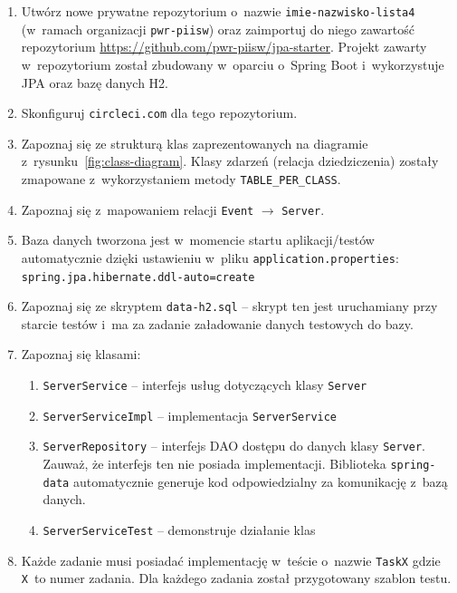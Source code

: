 \documentclass[12pt]{article}
\begin{document}
        \begin{enumerate}
            \item Utwórz nowe prywatne repozytorium o~nazwie \texttt{imie-nazwisko-lista4} (w~ramach organizacji \texttt{pwr-\allowbreak piisw}) oraz zaimportuj do niego zawartość repozytorium \url{https://github.com/pwr-piisw/jpa-starter}. Projekt zawarty w~repozytorium został zbudowany w~oparciu o~Spring Boot i~wykorzystuje JPA oraz bazę danych H2.
            \item Skonfiguruj \texttt{circleci.com} dla tego repozytorium.
            \item Zapoznaj się ze strukturą klas zaprezentowanych na diagramie z~rysunku~\ref{fig:class-diagram}. Klasy zdarzeń (relacja dziedziczenia) zostały zmapowane z~wykorzystaniem metody \texttt{TABLE\_PER\_CLASS}.
            \item Zapoznaj się z~mapowaniem relacji \texttt{Event} $\rightarrow$ \texttt{Server}.
            \item Baza danych tworzona jest w~momencie startu aplikacji/testów automatycznie dzięki ustawieniu w~pliku \texttt{application.properties}: \texttt{spring\-.jpa\-.hibernate\-.ddl-auto=create}
            \item Zapoznaj się ze skryptem \texttt{data-h2.sql} -- skrypt ten jest uruchamiany przy starcie testów i~ma za zadanie załadowanie danych testowych do bazy.
            \item Zapoznaj się klasami:
                \begin{enumerate}
                    \item \texttt{ServerService} – interfejs usług dotyczących klasy \texttt{Server}
                    \item \texttt{ServerServiceImpl} – implementacja \texttt{ServerService}
                    \item \texttt{ServerRepository} – interfejs DAO dostępu do danych klasy \texttt{Server}. Zauważ, że interfejs ten nie posiada implementacji. Biblioteka \texttt{spring-data} automatycznie generuje kod odpowiedzialny za komunikację z~bazą danych.
                    \item \texttt{ServerServiceTest} – demonstruje działanie klas
                \end{enumerate}
            \item Każde zadanie musi posiadać implementację w~teście o~nazwie \texttt{TaskX} gdzie \texttt{X}~to numer zadania. Dla każdego zadania został przygotowany szablon testu.
        \end{enumerate}
\end{document}
